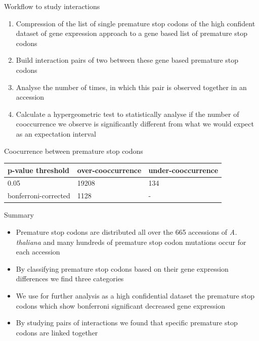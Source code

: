 \documentclass{beamer}
\begin{document}
\begin{frame}{Workflow to study interactions}
	\begin{enumerate}
		\item Compression of the list of single premature stop codons of the high confident dataset of gene expression approach to a gene based list of premature stop codons 
		\item Build interaction pairs of two between these gene based premature stop codons 
		\item Analyse the number of times, in which this pair is observed together in an accession 
		\item Calculate a hypergeometric test to statistically analyse if the number of cooccurrence we observe is significantly different from what we would expect as an expectation interval
	\end{enumerate}
\end{frame}
\begin{frame}{Coocurrence between premature stop codons}
	\begin{table}[tb]
		\label{tab:Coocurrence}
		\centering
		\begin{tabular}{|l|l|l|}
		\hline
		\textbf{p-value threshold} & \textbf{over-cooccurrence}  &  \textbf{under-cooccurrence}  \\ \hline
		0.05 & 19208 &  134 \\ \hline
		bonferroni-corrected & 1128 &  - \\ \hline
		\end{tabular}
		\end{table}
\end{frame}
\begin{frame}{Summary}
	\begin{itemize}
		\item Premature stop codons are distributed all over the 665 accessions of \textit{A. thaliana} and many hundreds of premature stop codon mutations occur for each accession
		\item By classifying premature stop codons based on their gene expression differences we find three categories 
		\item We use for further analysis as a high confidential dataset the premature stop codons which show bonferroni significant decreased gene expression 
		\item By studying pairs of interactions we found that specific premature stop codons are linked together 
	\end{itemize}
\end{frame}
\end{document}
